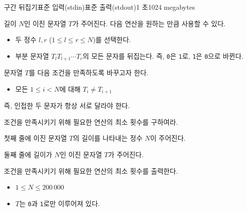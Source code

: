 \def\probtitle{구간 뒤집기}
\def\probno{E} %

\begin{problem}{\probtitle}{표준 입력(stdin)}{표준 출력(stdout)}{1 초}{1024 megabytes}

길이 $N$인 이진 문자열 $T$가 주어진다. 다음 연산을 원하는 만큼 사용할 수 있다.

\begin{itemize}[topsep=0pt,noitemsep]
    \item 두 정수 $l, r$ ($1 \le l \le r \le N$)를 선택한다.
    \item 부분 문자열 $T_l T_{l+1} \cdots T_r$의 모든 문자를 뒤집는다.
    즉, \texttt{0}은 \texttt{1}로, \texttt{1}은 \texttt{0}으로 바뀐다.
\end{itemize}

문자열 $T$를 다음 조건을 만족하도록 바꾸고자 한다.

\begin{itemize}[topsep=0pt,noitemsep]
    \item 모든 $1 \le i < N$에 대해 $T_i \ne T_{i+1}$
\end{itemize}

즉, 인접한 두 문자가 항상 서로 달라야 한다.

조건을 만족시키기 위해 필요한 연산의 최소 횟수를 구하여라.

\InputFile

첫째 줄에 이진 문자열 $T$의 길이를 나타내는 정수 $N$이 주어진다.

둘째 줄에 길이가 $N$인 이진 문자열 $T$가 주어진다.

\OutputFile

조건을 만족시키기 위해 필요한 연산의 최소 횟수를 출력한다.

\Constraints

\begin{itemize}[topsep=0pt,noitemsep]
    \item $1 \le N \le 200\,000$
    \item $T$는 \texttt{0}과 \texttt{1}로만 이루어져 있다.
\end{itemize}

\Example

\begin{example}
\end{example}

\end{problem}